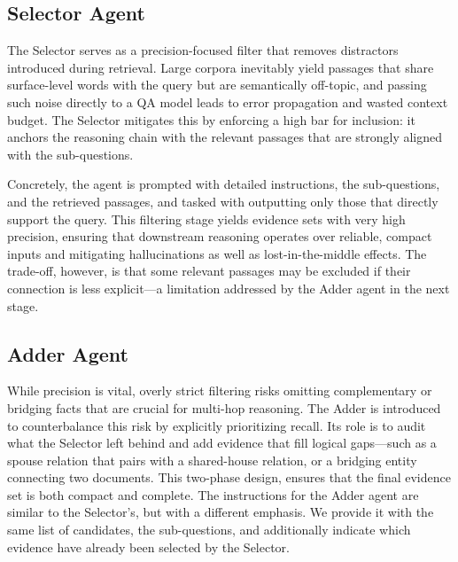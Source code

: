 \documentclass{article} %
\begin{document}
\subsection{Selector Agent}

The Selector serves as a precision-focused filter that removes distractors introduced during retrieval. Large corpora inevitably yield passages that share surface-level words with the query but are semantically off-topic, and passing such noise directly to a QA model leads to error propagation and wasted context budget. The Selector mitigates this by enforcing a high bar for inclusion: it anchors the reasoning chain with the relevant passages that are strongly aligned with the sub-questions. %

Concretely, the agent is prompted with detailed instructions, the sub-questions, and the retrieved  passages, and tasked with  outputting only those that directly support the query. This filtering stage yields evidence sets with very high precision, ensuring that downstream reasoning operates over reliable, compact inputs and mitigating hallucinations as well as lost-in-the-middle effects. The trade-off, however, is that some relevant passages may be excluded if their connection is less explicit—a limitation addressed by the Adder agent in the next stage.



\subsection{Adder Agent}
While precision is vital, overly strict filtering risks omitting complementary or bridging facts that are crucial for multi-hop reasoning. The Adder is introduced to counterbalance this risk by explicitly prioritizing recall. Its role is to audit what the Selector left behind and add evidence that fill logical gaps—such as a spouse relation that pairs with a shared-house relation, or a bridging entity connecting two documents. This two-phase design, ensures that the final evidence set is both compact and complete. The instructions for the Adder agent are similar to the Selector’s, but with a different emphasis. We provide it with the same list of candidates, the sub-questions, and additionally indicate which evidence have already been selected by the Selector. 
\end{document}
